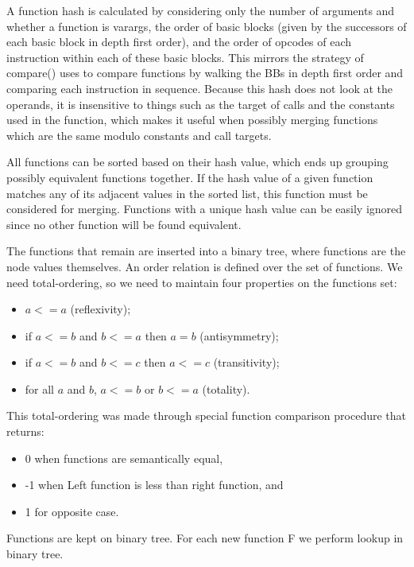 A function hash is calculated by considering only the number of arguments and
whether a function is varargs, the order of basic blocks (given by the
successors of each basic block in depth first order), and the order of
opcodes of each instruction within each of these basic blocks.
This mirrors the strategy of compare() uses to compare functions by walking the BBs in depth
first order and comparing each instruction in sequence. Because this hash
does not look at the operands, it is insensitive to things such as the
target of calls and the constants used in the function, which makes it useful
when possibly merging functions which are the same modulo constants and call
targets.


All functions can be sorted based on their hash value, which ends up grouping
possibly equivalent functions together.
If the hash value of a given function matches any of its adjacent values in
the sorted list, this function must be considered for merging.
Functions with a unique hash value can be easily ignored since no other function
will be found equivalent.


The functions that remain are inserted into a binary tree, where functions are
the node values themselves.
An order relation is defined over the set of functions.
We need total-ordering, so we need to maintain four properties on the functions set:
\begin{itemize}
\item $a <= a$ (reflexivity);
\item if $a <= b$ and $b <= a$ then $a = b$ (antisymmetry);
\item if $a <= b$ and $b <= c$ then $a <= c$ (transitivity);
\item for all $a$ and $b$, $a <= b$ or $b <= a$ (totality).
\end{itemize}
This total-ordering was made through special function comparison procedure that
returns:
\begin{itemize}
\item 0 when functions are semantically equal,
\item -1 when Left function is less than right function, and
\item 1 for opposite case.
\end{itemize}

Functions are kept on binary tree. For each new function F we perform
lookup in binary tree.





